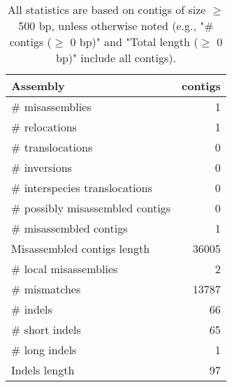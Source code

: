 \documentclass[12pt,a4paper]{article}
\begin{document}
\begin{table}[ht]
\begin{center}
\caption{All statistics are based on contigs of size $\geq$ 500 bp, unless otherwise noted (e.g., "\# contigs ($\geq$ 0 bp)" and "Total length ($\geq$ 0 bp)" include all contigs).}
\begin{tabular}{|l*{1}{|r}|}
\hline
Assembly & contigs \\ \hline
\# misassemblies & 1 \\ \hline
\hspace{5mm}\# relocations & 1 \\ \hline
\hspace{5mm}\# translocations & 0 \\ \hline
\hspace{5mm}\# inversions & 0 \\ \hline
\hspace{5mm}\# interspecies translocations & 0 \\ \hline
\# possibly misassembled contigs & 0 \\ \hline
\# misassembled contigs & 1 \\ \hline
Misassembled contigs length & 36005 \\ \hline
\# local misassemblies & 2 \\ \hline
\# mismatches & 13787 \\ \hline
\# indels & 66 \\ \hline
\hspace{5mm}\# short indels & 65 \\ \hline
\hspace{5mm}\# long indels & 1 \\ \hline
Indels length & 97 \\ \hline
\end{tabular}
\end{center}
\end{table}
\end{document}

